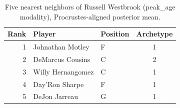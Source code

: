 \begin{table}[htbp]
  \centering\small
  \begin{tabular}{rllc}
    \toprule
    Rank & Player & Position & Archetype \\
    \midrule
    1 & Johnathan Motley & F & 1 \\
    2 & DeMarcus Cousins & C & 2 \\
    3 & Willy Hernangomez & C & 1 \\
    4 & Day'Ron Sharpe & F & 1 \\
    5 & DeJon Jarreau & G & 1 \\
    \bottomrule
  \end{tabular}
  \caption{Five nearest neighbors of Russell Westbrook (peak_age modality), Procrustes-aligned posterior mean.}
  \label{tab:Russell_Westbrook_neighbors_peak_age}
\end{table}

